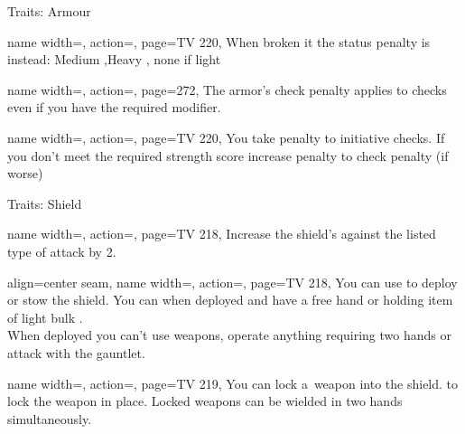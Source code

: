 \begin{PageBackLandscape}
\begin{TablesHalf}{\backTableHeight}
\begin{Table}{Traits: Armour}
\begin{entry}{}{%
                name width=\conditionLength,%
                action=\Laminar,
                page=TV 220,
            }
                When broken it the status penalty is instead:
                \quad Medium ,\quad Heavy , \quad none if light
            \end{entry}%
            \begin{entry}{}{%
                name width=\conditionLength,%
                action=\Noisy,
                page=272,
            }
                The armor's check penalty applies to \StealthT checks even if you have the required \Strength modifier.
            \end{entry}%
            \begin{entry}{}{%
                name width=\conditionLength,%
                action=\Ponderous,
                page=TV 220,
            }
                You take  penalty to initiative checks.
                If you don't meet the required strength score increase penalty to check penalty {(if worse)}
            \end{entry}%
        \end{Table}
        \TableSpace
        \begin{Table}{Traits: Shield}
            \begin{entry}{}{%
                name width=\conditionLength,%
                action=\Deflecting,
                page=TV 218,
            }
                Increase the shield's \Hardness against the listed type of attack by 2.
            \end{entry}
            \begin{entry}{}{%
                align=center seam,
                name width=\conditionLength,%
                action=\Foldaway,
                page=TV 218,
            }
                You can use  to deploy or stow the shield.
                You can  when deployed and have a free hand or holding item of light bulk . \\
                When deployed you can't use weapons, operate anything requiring two hands or attack with the gauntlet.
            \end{entry}
            \begin{entry}{}{%
                name width=\conditionLength,%
                action=\Harnessed,
                page=TV 219,
            }
                You can lock a \Jousting\,weapon into the shield.  to lock the weapon in place.
                Locked weapons can be wielded in two hands simultaneously.\\

\end{entry}
\end{Table}
\end{TablesHalf}
\end{PageBackLandscape}

